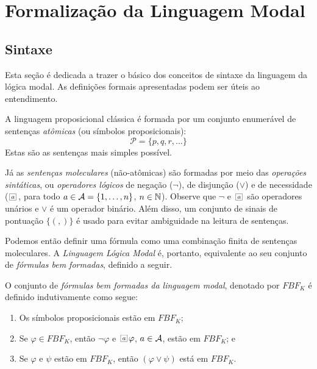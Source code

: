 \section{Formalização da Linguagem Modal }
\subsection{Sintaxe}
\label{sec:sintaxe}

Esta seção é dedicada a trazer o básico dos conceitos de sintaxe da linguagem da
lógica modal. As definições formais apresentadas podem ser úteis ao
entendimento.

A linguagem proposicional clássica é formada por um conjunto enumerável de sentenças
\textit{at\^omicas} (ou símbolos proposicionais): 
\begin{equation}
\label{simb_prop}
    \mathcal{P} = \{p, q, r, \ldots\}
\end{equation}
Estas são as sentenças mais simples possível.

Já as \textit{sentenças moleculares} (não-at\^omicas) são formadas por meio das
\textit{operações sintáticas}, ou \textit{operadores lógicos} de negação
($\neg$), de disjunção ($\vee$)  e de necessidade ($\nec{\agent}$, para todo
$a \in {\cal{A}} = \{1,\ldots, n\}$, $n \in \mbox{$\mathbb N$}$). Observe que $\neg$ e
$\nec{\agent}$ são operadores unários e $\vee$ é um operador binário. Além
disso, um conjunto de sinais de pontuação $\{(,)\}$ é usado para
evitar ambiguidade na leitura de sentenças.

Podemos então definir uma fórmula como uma combinação finita de sentenças
moleculares. A \textit{Linguagem Lógica Modal} é, portanto, equivalente ao seu
conjunto de \textit{fórmulas bem formadas}, definido a seguir.

\begin{definition} O conjunto de \textit{fórmulas bem formadas da linguagem modal}, denotado por
$FBF_{K}$ é definido indutivamente como segue:
    \label{def:fbf}

    \begin{enumerate}
    \item Os símbolos proposicionais estão em $FBF_{K}$;
    \item Se $\varphi \in FBF_{K}$, então $\neg \varphi$ e $\nec{\agent}\varphi$, $a \in {\cal{A}}$, estão em $FBF_{K}$; e
    \item Se $\varphi$ e $\psi$ estão em $FBF_{K}$, então $(\varphi \vee \psi)$ está em $FBF_{K}$.
    \end{enumerate}
    
\label{def:fbf}
\end{definition}

